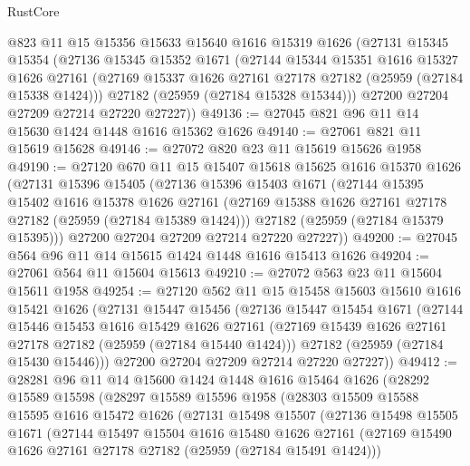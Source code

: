 \begin{lexlean}{RustCore}
\begin{coremodule}
    @823
    @11
    @15
    @15356
    @15633
    @15640
    @1616
    @15319
    @1626
    (@27131
      @15345
      @15354
      (@27136
        @15345
        @15352
        @1671
        (@27144
          @15344
          @15351
          @1616
          @15327
          @1626
          @27161
          (@27169 @15337 @1626 @27161 @27178 @27182 (@25959 (@27184 @15338 @1424)))
          @27182
          (@25959 (@27184 @15328 @15344)))
        @27200
        @27204
        @27209
        @27214
        @27220
        @27227))
@49136 := @27045 @821 @96 @11 @14 @15630 @1424 @1448 @1616 @15362 @1626
@49140 := @27061 @821 @11 @15619 @15628
@49146 := @27072 @820 @23 @11 @15619 @15626 @1958
@49190 := @27120
    @670
    @11
    @15
    @15407
    @15618
    @15625
    @1616
    @15370
    @1626
    (@27131
      @15396
      @15405
      (@27136
        @15396
        @15403
        @1671
        (@27144
          @15395
          @15402
          @1616
          @15378
          @1626
          @27161
          (@27169 @15388 @1626 @27161 @27178 @27182 (@25959 (@27184 @15389 @1424)))
          @27182
          (@25959 (@27184 @15379 @15395)))
        @27200
        @27204
        @27209
        @27214
        @27220
        @27227))
@49200 := @27045 @564 @96 @11 @14 @15615 @1424 @1448 @1616 @15413 @1626
@49204 := @27061 @564 @11 @15604 @15613
@49210 := @27072 @563 @23 @11 @15604 @15611 @1958
@49254 := @27120
    @562
    @11
    @15
    @15458
    @15603
    @15610
    @1616
    @15421
    @1626
    (@27131
      @15447
      @15456
      (@27136
        @15447
        @15454
        @1671
        (@27144
          @15446
          @15453
          @1616
          @15429
          @1626
          @27161
          (@27169 @15439 @1626 @27161 @27178 @27182 (@25959 (@27184 @15440 @1424)))
          @27182
          (@25959 (@27184 @15430 @15446)))
        @27200
        @27204
        @27209
        @27214
        @27220
        @27227))
@49412 := @28281
    @96
    @11
    @14
    @15600
    @1424
    @1448
    @1616
    @15464
    @1626
    (@28292
      @15589
      @15598
      (@28297
        @15589
        @15596
        @1958
        (@28303
          @15509
          @15588
          @15595
          @1616
          @15472
          @1626
          (@27131
            @15498
            @15507
            (@27136
              @15498
              @15505
              @1671
              (@27144
                @15497
                @15504
                @1616
                @15480
                @1626
                @27161
                (@27169 @15490 @1626 @27161 @27178 @27182 (@25959 (@27184 @15491 @1424)))

\end{coremodule}
\end{lexlean}
